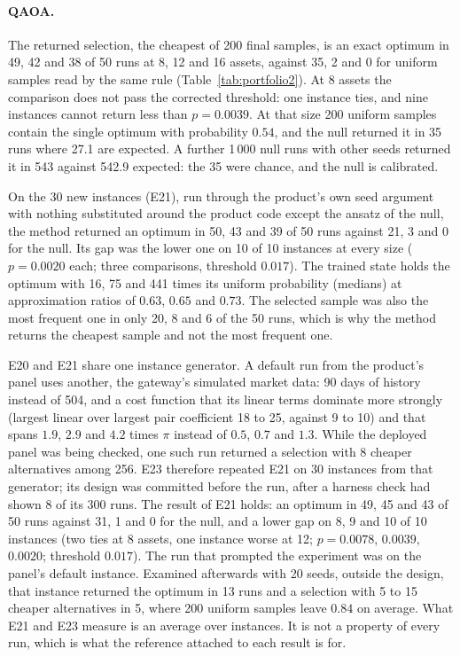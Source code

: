 \documentclass[11pt,a4paper]{article}
\begin{document}
\paragraph{QAOA.} The returned selection, the cheapest of 200 final
samples, is an
exact optimum in 49, 42 and 38 of 50 runs at 8, 12 and 16 assets, against
35, 2 and 0 for uniform
samples read by the same rule (Table~\ref{tab:portfolio2}). At 8 assets the
comparison does not pass the corrected threshold: one instance ties, and
nine instances cannot return less than $p = 0.0039$. At that size 200
uniform samples contain the single optimum with probability $0.54$, and the
null returned it in 35 runs where 27.1 are expected. A further 1\,000 null
runs with other seeds returned it in 543 against 542.9 expected: the 35 were
chance, and the null is calibrated.

On the 30 new instances (E21), run through the product's own seed argument
with nothing substituted around the product code except the ansatz of the
null, the method returned an optimum in 50, 43 and 39 of 50 runs against 21,
3 and 0 for the null. Its gap was the lower one on 10 of 10 instances at
every size ($p = 0.0020$ each; three comparisons, threshold $0.017$). The
trained state holds the optimum with 16, 75 and 441 times its uniform
probability (medians) at approximation ratios of $0.63$, $0.65$ and $0.73$.
The selected sample was also the most frequent one in only 20, 8 and 6 of
the 50 runs, which is why the method returns the cheapest sample and not
the most frequent one.

E20 and E21 share one instance generator. A default run from the product's
panel uses another, the gateway's simulated market data: 90 days of history
instead of 504, and a cost function that its linear terms dominate more
strongly (largest linear over largest pair coefficient 18 to 25, against 9
to 10) and that spans $1.9$, $2.9$ and $4.2$ times $\pi$ instead of $0.5$,
$0.7$ and $1.3$. While the deployed panel was being checked, one such run
returned a selection with 8 cheaper alternatives among 256. E23 therefore
repeated E21 on 30 instances from that generator; its design was committed
before the run, after a harness check had shown 8 of its 300 runs. The
result of E21 holds: an optimum in 49, 45 and 43 of 50 runs against 31, 1
and 0 for the null, and a lower gap on 8, 9 and 10 of 10 instances (two
ties at 8 assets, one instance worse at 12; $p = 0.0078$, $0.0039$,
$0.0020$; threshold $0.017$). The run that prompted the experiment was on
the panel's default instance. Examined afterwards with 20 seeds, outside
the design, that instance returned the optimum in 13 runs and a selection
with 5 to 15 cheaper alternatives in 5, where 200 uniform samples leave
$0.84$ on average. What E21 and E23 measure is an average over instances.
It is not a property of every run, which is what the reference attached to
each result is for.
\end{document}
